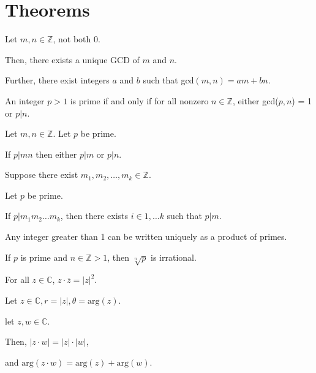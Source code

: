 \documentclass{article}
\newcommand{\Z}{\mathbb Z}
\newcommand{\C}{\mathbb C}
\begin{document}
\section{Theorems}

    Let $m, n \in \Z$, not both 0.
    
    Then, there exists a unique GCD of $m$ and $n$.
    
    Further, there exist integers $a$ and $b$ such that gcd$(m, n) = am + bn$.
    

    An integer $p > 1$ is prime if and only if for all nonzero $n \in \Z$, either gcd($p, n$) = 1 or $p|n$.


    Let $m, n \in \Z$. Let $p$ be prime.
    
    If $p|mn$ then either $p|m$ or $p|n$.
    

    Suppose there exist $m_1, m_2, \hdots, m_k \in \Z$.
    
    Let $p$ be prime.
    
    If $p|m_1m_2\hdots m_k$, then there exists $i \in {1, \hdots k}$ such that $p|m$.
    

    Any integer greater than 1 can be written uniquely as a product of primes.
    

    If $p$ is prime and $n \in \Z > 1$, then $\sqrt[n]{p}$ is irrational.
    
\newpage
    

    For all $z \in \C$, $z \cdot \overline{z} = |z|^2$.
    
    
    Let $z \in \C, r = |z|, \theta = \text{arg}(z)$.
    

    let $z,w \in \C$.
    
    Then, $|z\cdot w| = |z| \cdot |w|$,
    
    and $\text{arg}(z\cdot w) =\text{arg}(z)+\text{arg}(w)$.
    
\end{document}
